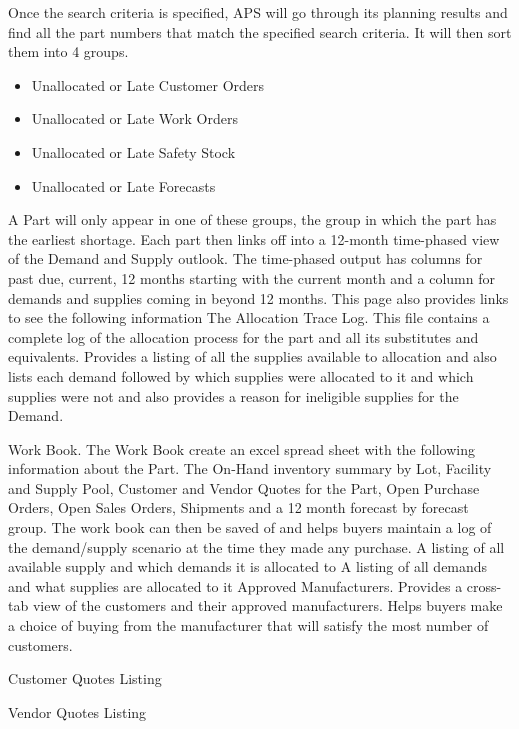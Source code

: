 Once the search criteria is specified, APS will go through its planning results and find all the part numbers that match the specified search criteria. It will then sort them into 4 groups. 
\begin{itemize}
\item Unallocated or Late Customer Orders
\item Unallocated or Late Work Orders
\item Unallocated or Late Safety Stock
\item Unallocated or Late Forecasts
\end{itemize}
A Part will only appear in one of these groups, the group in which the part has the earliest shortage. Each part then links off into a 12-month time-phased view of the Demand and Supply outlook. The time-phased output has columns for past due, current, 12 months starting with the current month and a column for demands and supplies coming in beyond 12 months. This page also provides links to see the following information
The Allocation Trace Log. This file contains a complete log of the allocation process for the part and all its substitutes and equivalents. Provides a listing of all the supplies available to allocation and also lists each demand followed by which supplies were allocated to it and which supplies were not and also provides a reason for ineligible supplies for the Demand.

Work Book. The Work Book create an excel spread sheet with the following information about the Part. The On-Hand inventory summary by Lot, Facility and Supply Pool, Customer and Vendor Quotes for the Part, Open Purchase Orders, Open Sales Orders, Shipments and a 12 month forecast by forecast group. The work book can then be saved of and helps buyers maintain a log of the demand/supply scenario at the time they made any purchase.
A listing of all available supply and which demands it is allocated to
A listing of all demands and what supplies are allocated to it
Approved Manufacturers. Provides a cross-tab view of the customers and their approved manufacturers. Helps buyers make a choice of buying from the manufacturer that will satisfy the most number of customers.

Customer Quotes Listing

Vendor Quotes Listing

